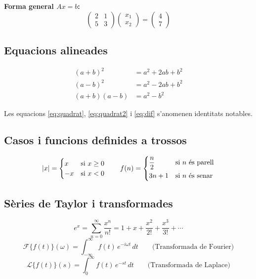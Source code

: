 \documentclass[informe, catalan]{practicaitic}
\theoremstyle{definition}
\theoremstyle{remark}
\begin{document}
\textbf{Forma general $Ax = b$:}
\[
\begin{pmatrix} 2 & 1 \\ 5 & 3 \end{pmatrix}
\begin{pmatrix} x_1 \\ x_2 \end{pmatrix}
=
\begin{pmatrix} 4 \\ 7 \end{pmatrix}
\]

\subsection{Equacions alineades}

\begin{align}
  (a+b)^2 &= a^2 + 2ab + b^2 \label{eq:quadrat}\\
  (a-b)^2 &= a^2 - 2ab + b^2 \label{eq:quadrat2}\\
  (a+b)(a-b) &= a^2 - b^2 \label{eq:dif}
\end{align}

Les equacions \eqref{eq:quadrat}, \eqref{eq:quadrat2} i \eqref{eq:dif}
s'anomenen identitats notables.

\subsection{Casos i funcions definides a trossos}

\[
|x| = \begin{cases} x & \text{si } x \geq 0 \\ -x & \text{si } x < 0 \end{cases}
\qquad
f(n) = \begin{dcases}
  \frac{n}{2} & \text{si $n$ és parell} \\
  3n + 1      & \text{si $n$ és senar}
\end{dcases}
\]

\subsection{Sèries de Taylor i transformades}

\[
e^x = \sum_{n=0}^{\infty} \frac{x^n}{n!} = 1 + x + \frac{x^2}{2!} + \frac{x^3}{3!} + \cdots
\]
\[
\mathcal{F}\{f(t)\}(\omega) = \int_{-\infty}^{\infty} f(t)\,e^{-i\omega t}\, dt
\qquad \text{(Transformada de Fourier)}
\]
\[
\mathcal{L}\{f(t)\}(s) = \int_{0}^{\infty} f(t)\,e^{-st}\, dt
\qquad \text{(Transformada de Laplace)}
\]
\end{document}
